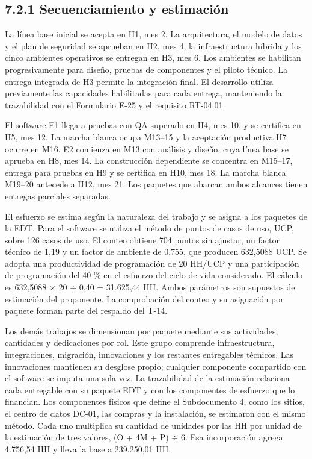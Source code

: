\documentclass[11pt]{article}
\begin{document}
\subsection{7.2.1 Secuenciamiento y estimación}

La línea base inicial se acepta en H1, mes 2. La arquitectura, el modelo de datos y el plan de seguridad se aprueban en H2, mes 4; la infraestructura híbrida y los cinco ambientes operativos se entregan en H3, mes 6. Los ambientes se habilitan progresivamente para diseño, pruebas de componentes y el piloto técnico. La entrega integrada de H3 permite la integración final. El desarrollo utiliza previamente las capacidades habilitadas para cada entrega, manteniendo la trazabilidad con el Formulario E-25 y el requisito RT-04.01.

El software E1 llega a pruebas con QA superado en H4, mes 10, y se certifica en H5, mes 12. La marcha blanca ocupa M13–15 y la aceptación productiva H7 ocurre en M16. E2 comienza en M13 con análisis y diseño, cuya línea base se aprueba en H8, mes 14. La construcción dependiente se concentra en M15–17, entrega para pruebas en H9 y se certifica en H10, mes 18. La marcha blanca M19–20 antecede a H12, mes 21. Los paquetes que abarcan ambos alcances tienen entregas parciales separadas.

El esfuerzo se estima según la naturaleza del trabajo y se asigna a los paquetes de la EDT. Para el software se utiliza el método de puntos de casos de uso, UCP, sobre 126 casos de uso. El conteo obtiene 704 puntos sin ajustar, un factor técnico de 1,19 y un factor de ambiente de 0,755, que producen 632,5088 UCP. Se adopta una productividad de programación de 20 HH/UCP y una participación de programación del 40 \% en el esfuerzo del ciclo de vida considerado. El cálculo es 632,5088 \(\times\) 20 \(\div\) 0,40 = 31.625,44 HH. Ambos parámetros son supuestos de estimación del proponente. La comprobación del conteo y su asignación por paquete forman parte del respaldo del T-14.

Los demás trabajos se dimensionan por paquete mediante sus actividades, cantidades y dedicaciones por rol. Este grupo comprende infraestructura, integraciones, migración, innovaciones y los restantes entregables técnicos. Las innovaciones mantienen su desglose propio; cualquier componente compartido con el software se imputa una sola vez. La trazabilidad de la estimación relaciona cada entregable con su paquete EDT y con los componentes de esfuerzo que lo financian. Los componentes físicos que define el Subdocumento 4, como los sitios, el centro de datos DC-01, las compras y la instalación, se estimaron con el mismo método. Cada uno multiplica su cantidad de unidades por las HH por unidad de la estimación de tres valores, (O + 4M + P) \(\div\) 6. Esa incorporación agrega 4.756,54 HH y lleva la base a 239.250,01 HH.
\end{document}

